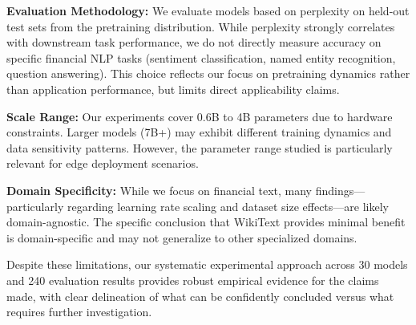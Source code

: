 \textbf{Evaluation Methodology:} We evaluate models based on perplexity on held-out test sets from the pretraining distribution. While perplexity strongly correlates with downstream task performance, we do not directly measure accuracy on specific financial NLP tasks (sentiment classification, named entity recognition, question answering). This choice reflects our focus on pretraining dynamics rather than application performance, but limits direct applicability claims.

\textbf{Scale Range:} Our experiments cover 0.6B to 4B parameters due to hardware constraints. Larger models (7B+) may exhibit different training dynamics and data sensitivity patterns. However, the parameter range studied is particularly relevant for edge deployment scenarios.

\textbf{Domain Specificity:} While we focus on financial text, many findings—particularly regarding learning rate scaling and dataset size effects—are likely domain-agnostic. The specific conclusion that WikiText provides minimal benefit is domain-specific and may not generalize to other specialized domains.

Despite these limitations, our systematic experimental approach across 30 models and 240 evaluation results provides robust empirical evidence for the claims made, with clear delineation of what can be confidently concluded versus what requires further investigation.